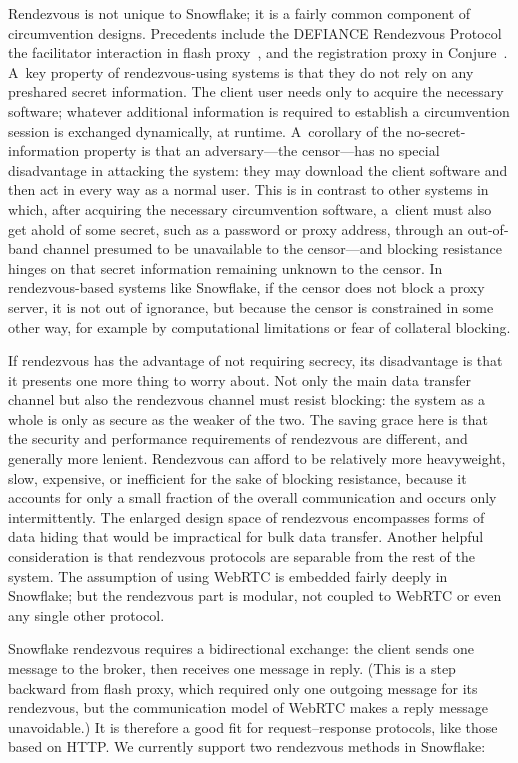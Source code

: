 \documentclass[letterpaper,twocolumn]{article}
\begin{document}
Rendezvous is not unique to Snowflake;
it is a fairly common component of circumvention designs.
Precedents include the
DEFIANCE Rendezvous Protocol~\cite[\S 3]{Lincoln2012a}
the facilitator interaction in flash proxy~\cite[\S 3]{Fifield2012a},
and the registration proxy in Conjure~\cite[\S 4.1]{Frolov2019b}.
A~key property of rendezvous-using systems
is that they do not rely on any preshared secret information.
The client user needs only to acquire the necessary software;
whatever additional information is required to establish a circumvention session
is exchanged dynamically, at runtime.
A~corollary of the no-secret-information property
is that an adversary---the censor---has
no special disadvantage in attacking the system:
they may download the client software
and then act in every way as a normal user.
This is in contrast to other systems in which,
after acquiring the necessary circumvention software,
a~client must also get ahold of some secret,
such as a password or proxy address,
through an out-of-band channel
presumed to be unavailable to the censor---and
blocking resistance hinges on that secret information
remaining unknown to the censor.
In rendezvous-based systems like Snowflake,
if the censor does not block a proxy server,
it is not out of ignorance,
but because the censor is constrained in some other way,
for example by computational limitations
or fear of collateral blocking.

If rendezvous has the advantage of not requiring secrecy,
its disadvantage is that it presents one more thing to worry about.
Not only the main data transfer channel
but also the rendezvous channel must resist blocking:
the system as a whole is only as secure as the weaker of the two.
The saving grace here is that the security and performance requirements
of rendezvous are different, and generally more lenient.
Rendezvous can afford to be relatively more heavyweight,
slow, expensive, or inefficient for the sake of blocking resistance,
because it accounts for only a small fraction of the overall communication
and occurs only intermittently.
The enlarged design space of rendezvous encompasses
forms of data hiding that would be impractical
for bulk data transfer.
Another helpful consideration is that rendezvous protocols
are separable from the rest of the system.
The assumption of using WebRTC is embedded fairly deeply in Snowflake;
but the rendezvous part is modular,
not coupled to WebRTC or even any single other protocol.

Snowflake rendezvous requires a bidirectional exchange:
the client sends one message to the broker, then receives
one message in reply.
(This is a step backward from flash proxy,
which required only one outgoing message for its rendezvous,
but the communication model of WebRTC makes a reply message unavoidable.)
It is therefore a good fit for request--response protocols,
like those based on HTTP.
We currently support two rendezvous methods in Snowflake:
\end{document}
